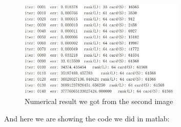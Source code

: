 \documentclass{article}
\begin{document}
\begin{figure}[htbp]
	\centering
	\includegraphics[width=0.70\textwidth]{explosion.pdf}
	\caption{Numerical result we got from the second image}
\end{figure}
And here we are showing the code we did in matlab:\\
\end{document}

